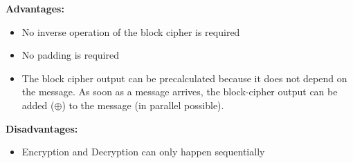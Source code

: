 \textbf{Advantages:}

\begin{itemize}
    \item No inverse operation of the block cipher is required
    \item No padding is required
    \item The block cipher output can be precalculated because it does not depend on the message. As soon as a message arrives, the block-cipher output can be added ($\oplus$) to the message (in parallel possible).
\end{itemize}

\textbf{Disadvantages:}

\begin{itemize}
    \item Encryption and Decryption can only happen sequentially
\end{itemize}
